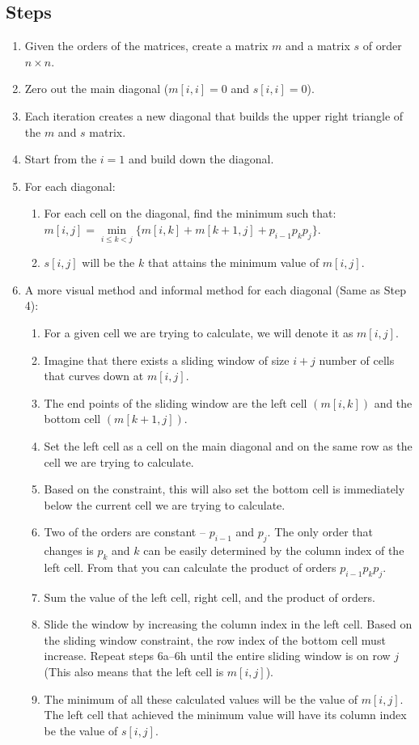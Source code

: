 \subsection*{Steps}
\begin{enumerate}
	\item Given the orders of the matrices, create a matrix $m$ and a matrix $s$ of order $n \times n$.
	\item Zero out the main diagonal ($m[i,i] = 0$ and $s[i,i] = 0$).
	\item Each iteration creates a new diagonal that builds the upper right triangle of the $m$ and $s$ matrix.
	\item Start from the $i = 1$ and build down the diagonal.
	\item For each diagonal:
	\begin{enumerate}
		\item For each cell on the diagonal, find the minimum such that:\\
			$m[i,j] = \min\limits_{i\leq k < j} \{ m[i,k] + m[k+1,j] + p_{i-1}p_kp_j \}$. 
		\item $s[i,j]$ will be the $k$ that attains the minimum value of $m[i,j]$.
	\end{enumerate}
	\item A more visual method and informal method for each diagonal (Same as Step 4):
	\begin{enumerate}
		\item For a given cell we are trying to calculate, we will denote it as $m[i,j]$.
		\item Imagine that there exists a sliding window of size $i + j$ number of cells that curves down at $m[i,j]$.
		\item The end points of the sliding window are the left cell $(m[i,k])$ and the bottom cell $(m[k+1,j])$.
		\item Set the left cell as a cell on the main diagonal and on the same row as the cell we are trying to calculate. 
		\item Based on the constraint, this will also set the bottom cell is immediately below the current cell we are trying to calculate.
		\item Two of the orders are constant -- $p_{i-1}$ and $p_j$. The only order that changes is $p_k$ and $k$ can be easily determined by the column index of the left cell. From that you can calculate the product of orders $p_{i-1}p_k p_j$.
		\item Sum the value of the left cell, right cell, and the product of orders.
		\item Slide the window by increasing the column index in the left cell. Based on the sliding window constraint, the row index of the bottom cell must increase. Repeat steps 6a--6h until the entire sliding window is on row $j$ (This also means that the left cell is $m[i,j]$).
		\item The minimum of all these calculated values will be the value of $m[i,j]$. The left cell that achieved the minimum value will have its column index be the value of $s[i,j]$.
	\end{enumerate}
\end{enumerate}

